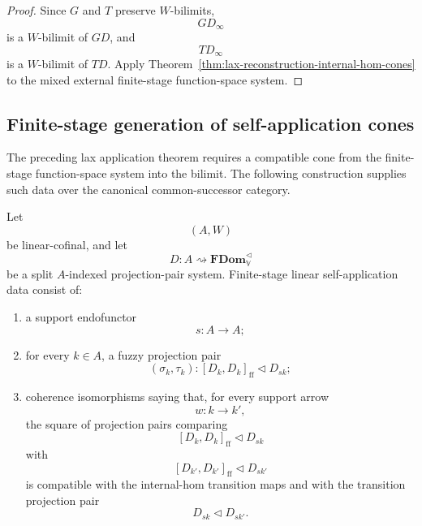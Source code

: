 \begin{proof}
Since \(G\) and \(T\) preserve \(W\)-bilimits,
\[
    GD_\infty
\]
is a \(W\)-bilimit of \(GD\), and
\[
    TD_\infty
\]
is a \(W\)-bilimit of \(TD\).  Apply
Theorem~\ref{thm:lax-reconstruction-internal-hom-cones} to the mixed external
finite-stage function-space system.
\end{proof}

\subsection{Finite-stage generation of self-application cones}

The preceding lax application theorem requires a compatible cone from the
finite-stage function-space system into the bilimit.  The following construction
supplies such data over the canonical common-successor category.

\begin{definition}
\label{def:finite-stage-linear-self-application-data}
Let
\[
    (A,W)
\]
be linear-cofinal, and let
\[
    D:A\rightsquigarrow\mathbf{FDom}_{\mathbb V}^{\triangleleft}
\]
be a split \(A\)-indexed projection-pair system.  Finite-stage linear
self-application data consist of:

\begin{enumerate}
    \item a support endofunctor
    \[
        s:A\to A;
    \]

    \item for every \(k\in A\), a fuzzy projection pair
    \[
        (\sigma_k,\tau_k):
        [D_k,D_k]_{\mathrm{ff}}
        \triangleleft
        D_{sk};
    \]

    \item coherence isomorphisms saying that, for every support arrow
    \[
        w:k\to k',
    \]
    the square of projection pairs comparing
    \[
        [D_k,D_k]_{\mathrm{ff}}
        \triangleleft
        D_{sk}
    \]
    with
    \[
        [D_{k'},D_{k'}]_{\mathrm{ff}}
        \triangleleft
        D_{sk'}
    \]
    is compatible with the internal-hom transition maps and with the transition
    projection pair
    \[
        D_{sk}\triangleleft D_{sk'}.
    \]
\end{enumerate}
\end{definition}

